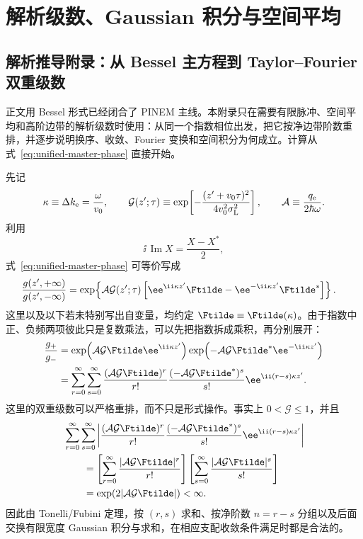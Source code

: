 \chapter{解析级数、Gaussian 积分与空间平均}
\label{app:analytic-series}

\section{解析推导附录：从 Bessel 主方程到 Taylor--Fourier 双重级数}

正文用 Bessel 形式已经闭合了 PINEM 主线。本附录只在需要有限脉冲、空间平均和高阶边带的解析级数时使用：从同一个指数相位出发，把它按净边带阶数重排，并逐步说明换序、收敛、Fourier 变换和空间积分为何成立。计算从式~\eqref{eq:unified-master-phase} 直接开始。

先记
\begin{equation}
\kappa\equiv \Delta k_{\mathrm e}=\frac{\omega}{v_0},
\qquad
\mathcal G(z';\tau)\equiv
\exp\!\left[-\frac{(z'+v_0\tau)^2}{4v_0^2\sigma_{\mathrm L}^2}\right],
\qquad
\mathcal A\equiv \frac{q_{\rm e}}{2\hbar\omega}.
\label{eq:compactdefs}
\end{equation}
利用
\[
\ii\,\operatorname{Im}X=\frac{X-X^*}{2},
\]
式~\eqref{eq:unified-master-phase} 可等价写成
\begin{align}
\frac{g(z',+\infty)}{g(z',-\infty)}
&=\exp\!\left\{
\mathcal A\mathcal G(z';\tau)
\left[
\ee^{\ii\kappa z'}\Ftilde-
\ee^{-\ii\kappa z'}\Ftilde^*
\right]\right\}.
\label{eq:master_exp_form}
\end{align}
这里以及以下若未特别写出自变量，均约定
\(
\Ftilde\equiv\Ftilde(\kappa)
\)。由于指数中正、负频两项彼此只是复数乘法，可以先把指数拆成乘积，再分别展开：
\begin{align}
\frac{g_+}{g_-}
&=\exp\!\left(\mathcal A\mathcal G\Ftilde\ee^{\ii\kappa z'}\right)
  \exp\!\left(-\mathcal A\mathcal G\Ftilde^*\ee^{-\ii\kappa z'}\right)\\
&=\sum_{r=0}^{\infty}\sum_{s=0}^{\infty}
\frac{(\mathcal A\mathcal G\Ftilde)^r}{r!}
\frac{(-\mathcal A\mathcal G\Ftilde^*)^s}{s!}
\ee^{\ii(r-s)\kappa z'}.
\label{eq:taylor-double-direct}
\end{align}
这里的双重级数可以严格重排，而不只是形式操作。事实上 $0<\mathcal G\le1$，并且
\begin{align}
&\sum_{r=0}^{\infty}\sum_{s=0}^{\infty}
\left|
\frac{(\mathcal A\mathcal G\Ftilde)^r}{r!}
\frac{(-\mathcal A\mathcal G\Ftilde^*)^s}{s!}
\ee^{\ii(r-s)\kappa z'}
\right|\\
&\qquad=
\left[\sum_{r=0}^{\infty}\frac{|\mathcal A\mathcal G\Ftilde|^r}{r!}\right]
\left[\sum_{s=0}^{\infty}\frac{|\mathcal A\mathcal G\Ftilde|^s}{s!}\right]\\
&\qquad=\exp\!\left(2|\mathcal A\mathcal G\Ftilde|\right)<\infty.
\label{eq:taylor-absolute-convergence}
\end{align}
因此由 Tonelli/Fubini 定理，按 $(r,s)$ 求和、按净阶数 $n=r-s$ 分组以及后面交换有限宽度 Gaussian 积分与求和，在相应支配收敛条件满足时都是合法的。


